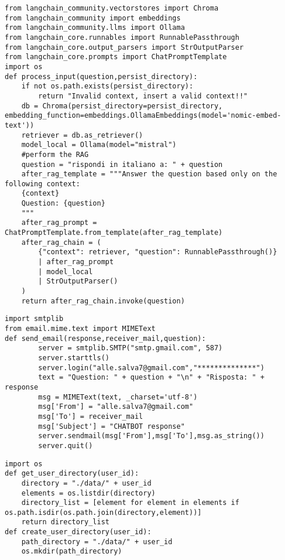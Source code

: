 \begin{lstlisting}[style=pythonstyle,caption={Codice del chatbot.py}, label={lst:chatbot}]
from langchain_community.vectorstores import Chroma
from langchain_community import embeddings
from langchain_community.llms import Ollama
from langchain_core.runnables import RunnablePassthrough
from langchain_core.output_parsers import StrOutputParser
from langchain_core.prompts import ChatPromptTemplate
import os
def process_input(question,persist_directory):
    if not os.path.exists(persist_directory):
        return "Invalid context, insert a valid context!!"
    db = Chroma(persist_directory=persist_directory, embedding_function=embeddings.OllamaEmbeddings(model='nomic-embed-text'))
    retriever = db.as_retriever()
    model_local = Ollama(model="mistral")
    #perform the RAG 
    question = "rispondi in italiano a: " + question
    after_rag_template = """Answer the question based only on the following context:
    {context}
    Question: {question}
    """
    after_rag_prompt = ChatPromptTemplate.from_template(after_rag_template)
    after_rag_chain = (
        {"context": retriever, "question": RunnablePassthrough()}
        | after_rag_prompt
        | model_local
        | StrOutputParser()
    )
    return after_rag_chain.invoke(question)
\end{lstlisting}
\begin{lstlisting}[style=pythonstyle,caption={Codice del mail\_chatbot.py}, label={lst:mailchatbot}]
import smtplib
from email.mime.text import MIMEText
def send_email(response,receiver_mail,question):
        server = smtplib.SMTP("smtp.gmail.com", 587)
        server.starttls()
        server.login("alle.salva7@gmail.com","**************")
        text = "Question: " + question + "\n" + "Risposta: " + response
        msg = MIMEText(text, _charset='utf-8')
        msg['From'] = "alle.salva7@gmail.com"
        msg['To'] = receiver_mail
        msg['Subject'] = "CHATBOT response"
        server.sendmail(msg['From'],msg['To'],msg.as_string())
        server.quit()
\end{lstlisting}
\begin{lstlisting}[style=pythonstyle,caption={Codice del directory\_manager.py}, label={lst:directorymanager}]
import os
def get_user_directory(user_id):
    directory = "./data/" + user_id
    elements = os.listdir(directory)
    directory_list = [element for element in elements if os.path.isdir(os.path.join(directory,element))]
    return directory_list
def create_user_directory(user_id):
    path_directory = "./data/" + user_id
    os.mkdir(path_directory)
\end{lstlisting}
